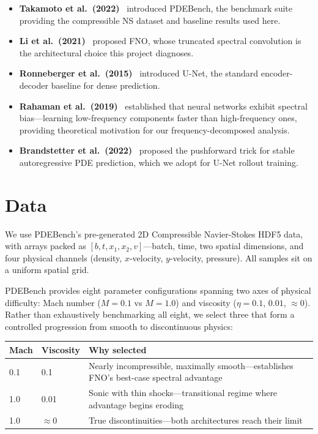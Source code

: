 \documentclass{article}
\begin{document}
\begin{itemize}
    \item \textbf{Takamoto et al.\ (2022)}~\cite{takamoto2022pdebench} introduced PDEBench, the benchmark suite providing the compressible NS dataset and baseline results used here.
    \item \textbf{Li et al.\ (2021)}~\cite{li2021fourier} proposed FNO, whose truncated spectral convolution is the architectural choice this project diagnoses.
    \item \textbf{Ronneberger et al.\ (2015)}~\cite{ronneberger2015unet} introduced U-Net, the standard encoder-decoder baseline for dense prediction.
    \item \textbf{Rahaman et al.\ (2019)}~\cite{rahaman2019spectral} established that neural networks exhibit spectral bias---learning low-frequency components faster than high-frequency ones, providing theoretical motivation for our frequency-decomposed analysis.
    \item \textbf{Brandstetter et al.\ (2022)}~\cite{brandstetter2022message} proposed the pushforward trick for stable autoregressive PDE prediction, which we adopt for U-Net rollout training.
\end{itemize}

\section*{Data}

We use PDEBench's pre-generated 2D Compressible Navier-Stokes HDF5 data, with arrays packed as $[b, t, x_1, x_2, v]$---batch, time, two spatial dimensions, and four physical channels (density, $x$-velocity, $y$-velocity, pressure). All samples sit on a uniform spatial grid.

PDEBench provides eight parameter configurations spanning two axes of physical difficulty: Mach number ($M=0.1$ vs $M=1.0$) and viscosity ($\eta=0.1$, $0.01$, $\approx 0$). Rather than exhaustively benchmarking all eight, we select three that form a controlled progression from smooth to discontinuous physics:

\begin{table}[h]
\centering
\begin{tabular}{@{}llp{7cm}@{}}
\toprule
\textbf{Mach} & \textbf{Viscosity} & \textbf{Why selected} \\
\midrule
0.1 & 0.1 & Nearly incompressible, maximally smooth---establishes FNO's best-case spectral advantage \\
1.0 & 0.01 & Sonic with thin shocks---transitional regime where advantage begins eroding \\
1.0 & $\approx 0$ & True discontinuities---both architectures reach their limit \\
\bottomrule
\end{tabular}
\end{table}
\end{document}
